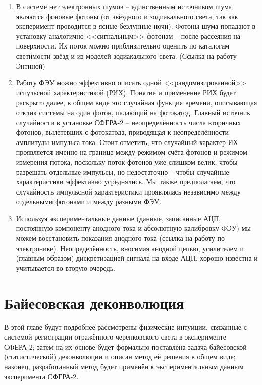 \documentclass[12pt]{book}
\begin{document}
	\begin{enumerate}
		\item В системе нет электронных шумов -- единственным источником шума являются фоновые фотоны (от звёздного и зодиакального света, так как эксперимент проводится в ясные безлунные ночи). Фотоны шума попадают в установку аналогично <<сигнальным>> фотонам -- после рассеяния на поверхности. Их поток можно приблизительно оценить по каталогам светимости звёзд и из моделей зодиакального света. (Ссылка на работу Энтиной)
		\item Работу ФЭУ можно эффективно описать одной <<рандомизированной>> испульсной характеристикой (РИХ). Понятие и применение РИХ будет раскрыто далее, в общем виде это случайная функция времени, описывающая отклик системы на один фотон, падающий на фотокатод. Главный источник случайности в установке СФЕРА-2 -- неопределённость числа вторичных фотонов, вылетевших с фотокатода, приводящая к неопределённости амплитуды импульса тока. Стоит отметить, что случайный характер ИХ проявляется именно на границе между режимом счёта фотонов и режимом измерения потока, поскольку поток фотонов уже слишком велик, чтобы разрешать отдельные импульсы, но недостаточно -- чтобы случайные характеристики эффективно усреднялись. Мы также предполагаем, что случайность импульсной характеристики проявлялась независимо между отдельными фотонами и между разными ФЭУ.
		\item Используя экспериментальные данные (данные, записанные АЦП, постоянную компоненту анодного тока и абсолютную калибровку ФЭУ) мы можем восстановить показания анодного тока (ссылка на работу по электронике). Неопределённость, вносимая анодной цепью, усилителем и (главным образом) дискретизацией сигнала на входе АЦП, хорошо известна и учитывается во вторую очередь.
	\end{enumerate}


	\chapter{Байесовская деконволюция}
	
	\label{chapt:bayesian-deconvolution}
	
	В этой главе будут подробнее рассмотрены физические интуиции, связанные с системой регистрации отражённого черенковского света в эксперименте СФЕРА-2; затем на их основе будет формально поставлена задача байесовской (статистической) деконволюции и описан метод её решения в общем виде; наконец, разработанный метод будет применён к экспериментальным данным эксперимента СФЕРА-2.
	
\end{document}
